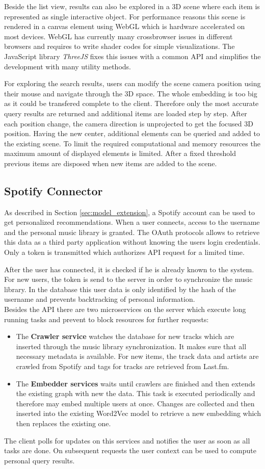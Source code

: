 \documentclass[sigconf]{acmart}
\begin{document}
Beside the list view, results can also be explored in a 3D scene where each item is represented as single interactive object. For performance reasons this scene is rendered in a canvas element using WebGL which is hardware accelerated on most devices. WebGL has currently many crossbrowser issues in different browsers and requires to write shader codes for simple visualizations. The JavaScript library \emph{ThreeJS} fixes this issues with a common API and simplifies the development with many utility methods.

For exploring the search results, users can modify the scene camera position using their mouse and navigate through the 3D space. The whole embedding is too big as it could be transfered complete to the client. Therefore only the most accurate query results are returned and additional items are loaded step by step. After each position change, the camera direction is unprojected to get the focused 3D position. Having the new center, additional elements can be queried and added to the existing scene. To limit the required computational and memory resources the maximum amount of displayed elements is limited. After a fixed threshold previous items are disposed when new items are added to the scene.

\subsection{Spotify Connector}
As described in Section \ref{sec:model_extension}, a Spotify account can be used to get personalized recommendations. When a user connects, access to the username and the personal music library is granted. The OAuth protocols allows to retrieve this data as a third party application without knowing the users login credentials. Only a token is transmitted which authorizes API request for a limited time.

After the user has connected, it is checked if he is already known to the system. For new users, the token is send to the server in order to synchronize the music library. In the database this user data is only identified by the hash of the username and prevents backtracking of personal information.\\

Besides the API there are two microservices on the server which execute long running tasks and prevent to block resources for further requests:
\begin{itemize}
	\item The \textbf{Crawler service} watches the database for new tracks which are inserted through the music library synchronization. It makes sure that all necessary metadata is available. For new items, the track data and artists are crawled from Spotify and tags for tracks are retrieved from Last.fm.
	\item The \textbf{Embedder services} waits until crawlers are finished and then extends the existing graph with new the data. This task is executed periodically and therefore may embed multiple users at once. Changes are collected and then inserted into the existing Word2Vec model to retrieve a new embedding which then replaces the existing one.
\end{itemize}

The client polls for updates on this services and notifies the user as soon as all tasks are done. On subsequent requests the user context can be used to compute personal query results. 
\end{document}
